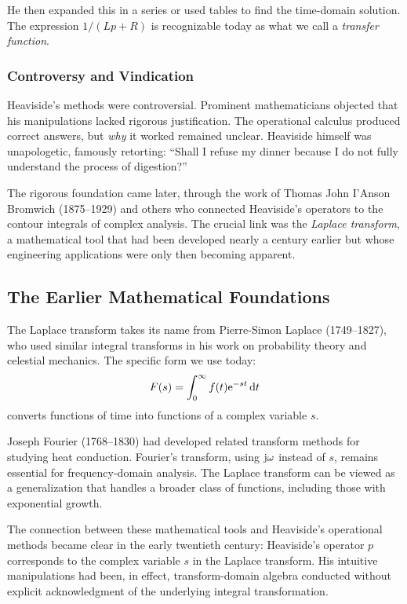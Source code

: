 He then expanded this in a series or used tables to find the time-domain solution. The expression $1/(Lp + R)$ is recognizable today as what we call a \textit{transfer function}.

\subsubsection{Controversy and Vindication}

Heaviside's methods were controversial. Prominent mathematicians objected that his manipulations lacked rigorous justification. The operational calculus produced correct answers, but \textit{why} it worked remained unclear. Heaviside himself was unapologetic, famously retorting: ``Shall I refuse my dinner because I do not fully understand the process of digestion?''

The rigorous foundation came later, through the work of Thomas John I'Anson Bromwich (1875--1929) and others who connected Heaviside's operators to the contour integrals of complex analysis. The crucial link was the \textit{Laplace transform}, a mathematical tool that had been developed nearly a century earlier but whose engineering applications were only then becoming apparent.

\subsection{The Earlier Mathematical Foundations}

The Laplace transform takes its name from Pierre-Simon Laplace (1749--1827), who used similar integral transforms in his work on probability theory and celestial mechanics. The specific form we use today:
\begin{equation}
F(s) = \int_0^{\infty} f(t)\mathrm{e}^{-st}\,\mathrm{d} t
\end{equation}
converts functions of time into functions of a complex variable $s$.

Joseph Fourier (1768--1830) had developed related transform methods for studying heat conduction. Fourier's transform, using $\mathrm{j}\omega$ instead of $s$, remains essential for frequency-domain analysis. The Laplace transform can be viewed as a generalization that handles a broader class of functions, including those with exponential growth.

The connection between these mathematical tools and Heaviside's operational methods became clear in the early twentieth century: Heaviside's operator $p$ corresponds to the complex variable $s$ in the Laplace transform. His intuitive manipulations had been, in effect, transform-domain algebra conducted without explicit acknowledgment of the underlying integral transformation.

